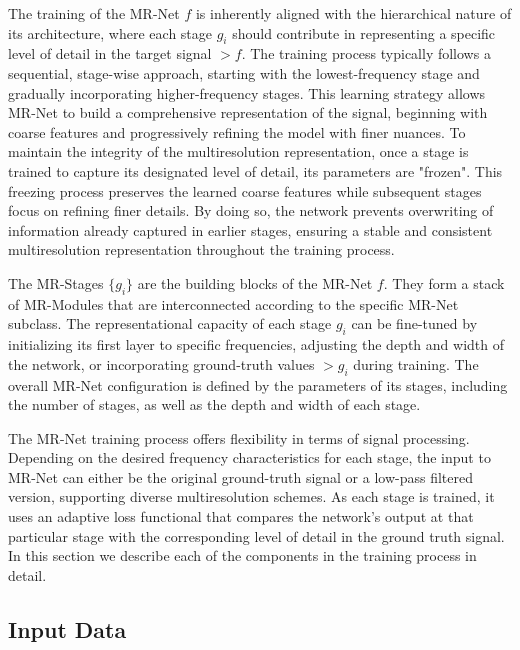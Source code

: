 The training of the MR-Net $f$ is inherently aligned with the hierarchical nature of its architecture, where each stage $g_i$ should contribute in representing a specific level of detail in the target signal $\gt{f}$. The training process typically follows a sequential, stage-wise approach, starting with the lowest-frequency stage and gradually incorporating higher-frequency stages. This learning strategy allows MR-Net to build a comprehensive representation of the signal, beginning with coarse features and progressively refining the model with finer nuances. To maintain the integrity of the multiresolution representation, once a stage is trained to capture its designated level of detail, its parameters are "frozen". This freezing process preserves the learned coarse features while subsequent stages focus on refining finer details. By doing so, the network prevents overwriting of information already captured in earlier stages, ensuring a stable and consistent multiresolution representation throughout the training process.

The MR-Stages $\{g_i\}$ are the building blocks of the MR-Net $f$. They form a stack of MR-Modules that are interconnected according to the specific MR-Net subclass. The representational capacity of each stage $g_i$ can be fine-tuned by initializing its first layer to specific frequencies, adjusting the depth and width of the network, or incorporating ground-truth values $\gt{g}_i$ during training. The overall MR-Net configuration is defined by the parameters of its stages, including the number of stages, as well as the depth and width of each stage.

The MR-Net training process offers flexibility in terms of signal processing. Depending on the desired frequency characteristics for each stage, the input to MR-Net can either 
be the original ground-truth signal or a low-pass filtered version, supporting diverse multiresolution schemes. As each stage is trained, it uses an adaptive loss functional that compares the network's output at that particular stage with the corresponding level of detail in the ground truth signal. In this section we describe each of the components in the training process in detail.

\subsection{Input Data}

